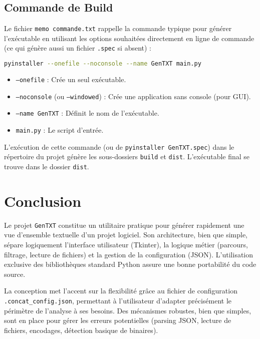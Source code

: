 \documentclass[11pt, a4paper]{article}
\begin{document}
\subsection{Commande de Build}
Le fichier \texttt{memo commande.txt} rappelle la commande typique pour générer l'exécutable en utilisant les options souhaitées directement en ligne de commande (ce qui génère aussi un fichier \texttt{.spec} si absent) :
\begin{lstlisting}[language=bash, caption={Commande de build PyInstaller}, label={lst:pyinstaller_cmd}]
pyinstaller --onefile --noconsole --name GenTXT main.py
\end{lstlisting}
\begin{itemize}
    \item \texttt{--onefile} : Crée un seul exécutable.
    \item \texttt{--noconsole} (ou \texttt{--windowed}) : Crée une application sans console (pour GUI).
    \item \texttt{--name GenTXT} : Définit le nom de l'exécutable.
    \item \texttt{main.py} : Le script d'entrée.
\end{itemize}
L'exécution de cette commande (ou de \texttt{pyinstaller GenTXT.spec}) dans le répertoire du projet génère les sous-dossiers \texttt{build} et \texttt{dist}. L'exécutable final se trouve dans le dossier \texttt{dist}.

\section{Conclusion}

Le projet \texttt{GenTXT} constitue un utilitaire pratique pour générer rapidement une vue d'ensemble textuelle d'un projet logiciel. Son architecture, bien que simple, sépare logiquement l'interface utilisateur (Tkinter), la logique métier (parcours, filtrage, lecture de fichiers) et la gestion de la configuration (JSON). L'utilisation exclusive des bibliothèques standard Python assure une bonne portabilité du code source.

La conception met l'accent sur la flexibilité grâce au fichier de configuration \texttt{.concat\_config.json}, permettant à l'utilisateur d'adapter précisément le périmètre de l'analyse à ses besoins. Des mécanismes robustes, bien que simples, sont en place pour gérer les erreurs potentielles (parsing JSON, lecture de fichiers, encodages, détection basique de binaires).
\end{document}
